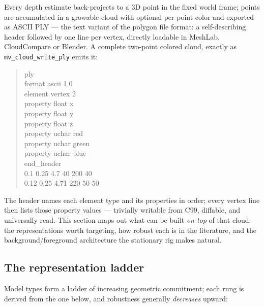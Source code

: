 \documentclass[11pt]{article}
\theoremstyle{definition}
\newcommand{\code}[1]{\texttt{#1}}
\begin{document}
Every depth estimate back-projects to a 3D point in the fixed world frame;
points are accumulated in a growable cloud with optional per-point color and
exported as ASCII PLY --- the text variant of the polygon file format: a
self-describing header followed by one line per vertex, directly loadable
in MeshLab, CloudCompare or Blender. A complete two-point colored cloud,
exactly as \code{mv\_cloud\_write\_ply} emits it:
\begin{quote}\ttfamily\footnotesize
ply\\
format ascii 1.0\\
element vertex 2\\
property float x\\
property float y\\
property float z\\
property uchar red\\
property uchar green\\
property uchar blue\\
end\_header\\
0.1 0.25 4.7 40 200 40\\
0.12 0.25 4.71 220 50 50
\end{quote}
The header names each element type and its properties in order; every
vertex line then lists those property values --- trivially writable from
C99, diffable, and universally read. This section maps out what can be
built \emph{on top} of
that cloud: the representations worth targeting, how robust each is in the
literature, and the background/foreground architecture the stationary rig
makes natural.

\subsection{The representation ladder}
\label{sec:ladder}

Model types form a ladder of increasing geometric commitment; each rung is
derived from the one below, and robustness generally \emph{decreases}
upward:
\end{document}
